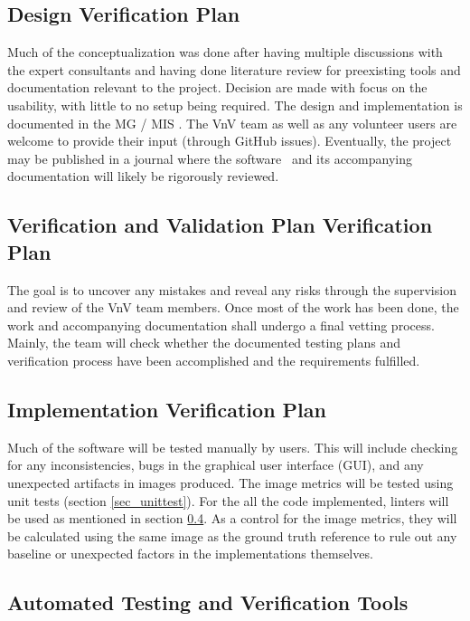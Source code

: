 \documentclass[12pt, titlepage]{article}
\begin{document}
\subsection{Design Verification Plan}

Much of the conceptualization was done after having multiple discussions with the expert 
consultants and having done literature review for preexisting tools and documentation 
relevant to the project. Decision are made with focus on the usability, with little to 
no setup being required. The design and implementation is documented in the 
MG / MIS \citep{MG,MIS}.
The VnV team as well as any volunteer users are welcome to provide
their input (through GitHub issues). Eventually, the project may be published in a journal
where the software \progname~and its accompanying documentation will 
likely be rigorously reviewed.



\subsection{Verification and Validation Plan Verification Plan}

The goal is to uncover any mistakes and reveal any risks through the supervision and 
review of the VnV team members. Once most of the work has been done, the work and
accompanying documentation shall undergo a final vetting process. Mainly, the team
will check whether the documented testing plans and verification process have been 
accomplished and the requirements fulfilled.


\subsection{Implementation Verification Plan}

Much of the software will be tested manually by users. This will include checking for
any inconsistencies, bugs in the graphical user interface (GUI), and any unexpected
artifacts in images produced.
The image metrics will be tested using unit tests (section \ref{sec_unittest}). For the
all the code implemented, linters will be used as mentioned in section \ref{sec_autotest_tools}.
As a control for the image metrics, they will be calculated using the same image as the ground truth 
reference to rule out any baseline or unexpected factors in the implementations themselves.


\subsection{Automated Testing and Verification Tools} \label{sec_autotest_tools}
\end{document}
